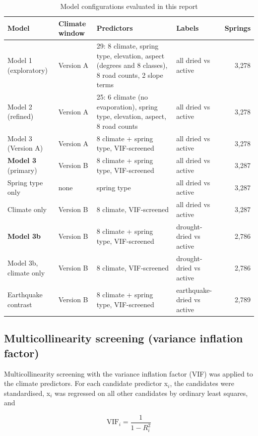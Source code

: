 \documentclass[12pt,a4paper]{article}
\begin{document}
\begin{table}[htbp]
\centering
\footnotesize
\caption{Model configurations evaluated in this report}
\label{tab:design}
\begin{tabularx}{\linewidth}{lLLLr}
\toprule
\textbf{Model} & \textbf{Climate window} & \textbf{Predictors} & \textbf{Labels} & \textbf{Springs} \\
\midrule
Model 1 (exploratory) & Version A & 29: 8 climate, spring type, elevation, aspect (degrees and 8 classes), 8 road counts, 2 slope terms & all dried vs active & 3,278 \\
Model 2 (refined) & Version A & 25: 6 climate (no evaporation), spring type, elevation, aspect, 8 road counts & all dried vs active & 3,278 \\
Model 3 (Version A) & Version A & 8 climate + spring type, VIF-screened & all dried vs active & 3,278 \\
\textbf{Model 3} (primary) & Version B & 8 climate + spring type, VIF-screened & all dried vs active & 3,287 \\
Spring type only & none & spring type & all dried vs active & 3,287 \\
Climate only & Version B & 8 climate, VIF-screened & all dried vs active & 3,287 \\
\textbf{Model 3b} & Version B & 8 climate + spring type, VIF-screened & drought-dried vs active & 2,786 \\
Model 3b, climate only & Version B & 8 climate, VIF-screened & drought-dried vs active & 2,786 \\
Earthquake contrast & Version B & 8 climate + spring type, VIF-screened & earthquake-dried vs active & 2,789 \\
\bottomrule
\end{tabularx}
\end{table}

\subsection{Multicollinearity screening (variance inflation factor)}

Multicollinearity screening with the variance inflation factor (VIF) was applied to the climate predictors. For each candidate predictor x$_i$, the candidates were standardised, x$_i$ was regressed on all other candidates by ordinary least squares, and

\begin{equation}
\mathrm{VIF}_i = \frac{1}{1 - R_i^2}
\end{equation}
\end{document}
